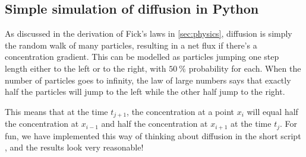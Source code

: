 \clearpage
\subsection{Simple simulation of diffusion in Python}\label{sec:simplediffusion}
As discussed in the derivation of Fick's laws in \ref{sec:physics}, diffusion is simply the random walk of many particles, resulting in a net flux if there's a concentration gradient. This can be modelled as particles jumping one step length either to the left or to the right, with \(\SI{50}{\percent}\) probability for each. When the number of particles goes to infinity, the law of large numbers says that exactly half the particles will jump to the left while the other half jump to the right.

This means that at the time \(t_{j+1}\), the concentration at a point \(x_i\) will equal half the concentration at \(x_{i-1}\) and half the concentration at \(x_{i+1}\) at the time \(t_j\). For fun, we have implemented this way of thinking about diffusion in the short script , and the results look very reasonable!


